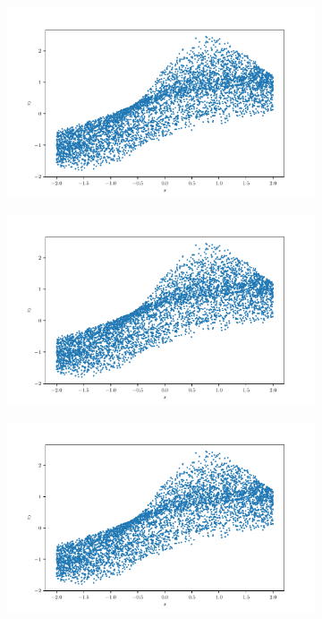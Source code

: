 \documentclass[10pt,a4paper]{article}
\begin{document}
\begin{figure}[!ht]
    \centering
    \begin{subfigure}{0.3\textwidth}
        \centering
        \includegraphics[width=\textwidth] {square_x_z0.pdf}
        \caption{}
        \label{fig_xzo}
    \end{subfigure}
    \begin{subfigure}{0.3\textwidth}
        \centering	
        \includegraphics[width=\textwidth]{square_x_z0.pdf}
        \caption{}
        \label{fig_xz1}
    \end{subfigure}
    \begin{subfigure}{0.3\textwidth}
        \centering
        \includegraphics[width=\textwidth] {square_x_z0.pdf}

\end{subfigure}
\end{figure}
\end{document}
